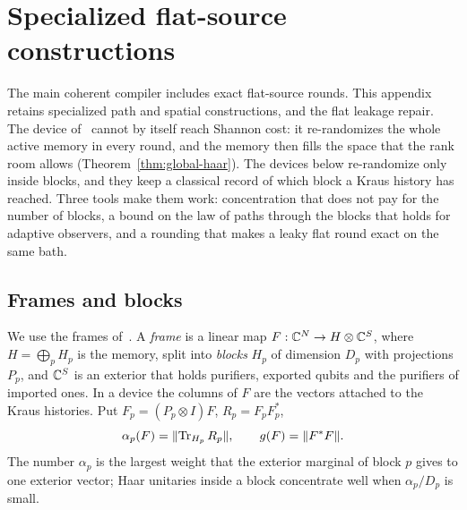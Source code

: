 \section{Specialized flat-source constructions}\label{sec:flat}

The main coherent compiler includes exact flat-source rounds. This appendix retains specialized path and spatial constructions,
and the flat leakage repair. The device of~\cite[Theorem~12.2]{DouglasMghirbiC} cannot by itself reach Shannon cost: it
re-randomizes the whole active memory in every round, and the memory then fills the space that the rank room allows
(Theorem~\ref{thm:global-haar}). The devices below re-randomize only inside blocks, and they keep a classical record of which block a
Kraus history has reached. Three tools make them work: concentration that does not pay for the number of blocks, a bound on the law of
paths through the blocks that holds for adaptive observers, and a rounding that makes a leaky flat round exact on the same
bath.

\subsection{Frames and blocks}

We use the frames of~\cite[Appendix~A]{DouglasMghirbiB}. A \emph{frame} is a linear map $F:\mathbb C^N\to H\otimes\mathbb C^S$, where
$H=\bigoplus_pH_p$ is the memory, split into \emph{blocks} $H_p$ of dimension $D_p$ with projections $P_p$, and $\mathbb C^S$ is an exterior that holds
purifiers, exported qubits and the purifiers of imported ones. In a device the columns of $F$ are the vectors attached to the Kraus
histories. Put $F_p=(P_p\otimes I)F$, $R_p=F_pF_p^*$,
\[
\alpha_p(F)=\lVert \operatorname{Tr}_{H_p}R_p\rVert,\qquad g(F)=\lVert F^*F\rVert .
\]
The number $\alpha_p$ is the largest weight that the exterior marginal of block $p$ gives to one exterior vector; Haar unitaries inside a block
concentrate well when $\alpha_p/D_p$ is small.

